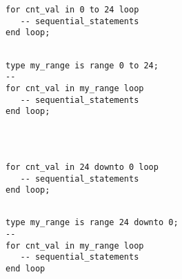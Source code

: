 \vspace{10pt}
\noindent
\begin{minipage}{0.5\linewidth}
\begin{lstlisting}



for cnt_val in 0 to 24 loop
   -- sequential_statements
end loop; 
\end{lstlisting}
\end{minipage}
\noindent
\begin{minipage}{0.5\linewidth}
\begin{lstlisting}

type my_range is range 0 to 24; 
--
for cnt_val in my_range loop
   -- sequential_statements
end loop; 
\end{lstlisting}
\end{minipage}
\noindent
\begin{minipage}{0.5\linewidth}
\begin{lstlisting}



for cnt_val in 24 downto 0 loop
   -- sequential_statements
end loop; 
\end{lstlisting}
\end{minipage}
\noindent
\begin{minipage}{0.5\linewidth}
\begin{lstlisting}

type my_range is range 24 downto 0; 
--
for cnt_val in my_range loop
   -- sequential_statements
end loop
\end{lstlisting}
\end{minipage}

